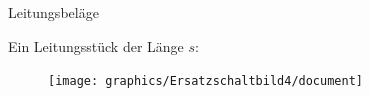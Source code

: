 \documentclass{beamer}
\begin{document}
\begin{frame}{Leitungsbeläge}

Ein Leitungsstück der Länge $s$:
\begin{figure}[!htb]
    \begin{center}
        \texttt{[image: graphics/Ersatzschaltbild4/document]}
    \end{center}
\end{figure}





\end{frame}
\end{document}
